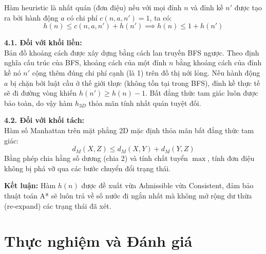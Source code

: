 \documentclass[12pt,a4paper]{article}
\begin{document}
Hàm heuristic là nhất quán (đơn điệu) nếu với mọi đỉnh $n$ và đỉnh kề $n'$ được tạo ra bởi hành động $a$ có chi phí $c(n, a, n') = 1$, ta có:
\begin{equation}
    h(n) \le c(n, a, n') + h(n') \implies h(n) \le 1 + h(n')
\end{equation}

\textbf{4.1. Đối với khối liền:}\\
Bản đồ khoảng cách được xây dựng bằng cách lan truyền BFS ngược. Theo định nghĩa cấu trúc của BFS, khoảng cách của một đỉnh $n$ bằng khoảng cách của đỉnh kề nó $n'$ cộng thêm đúng chi phí cạnh (là 1) trên đồ thị nới lỏng. Nếu hành động $a$ bị chặn bởi luật cầu ở thế giới thực (không tồn tại trong BFS), đỉnh kề thực tế sẽ đi đường vòng khiến $h(n') \ge h(n) - 1$. Bất đẳng thức tam giác luôn được bảo toàn, do vậy hàm $h_{3D}$ thỏa mãn tính nhất quán tuyệt đối.

\textbf{4.2. Đối với khối tách:}\\
Hàm số Manhattan trên mặt phẳng 2D mặc định thỏa mãn bất đẳng thức tam giác:
\begin{equation}
    d_M(X, Z) \le d_M(X, Y) + d_M(Y, Z)
\end{equation}
Bằng phép chia hằng số dương (chia 2) và tính chất tuyển $\max$, tính đơn điệu không bị phá vỡ qua các bước chuyển đổi trạng thái.

\textbf{Kết luận:} Hàm $h(n)$ được đề xuất vừa Admissible vừa Consistent, đảm bảo thuật toán A* sẽ luôn trả về số nước đi ngắn nhất mà không mở rộng dư thừa (re-expand) các trạng thái đã xét.

\section{Thực nghiệm và Đánh giá}
\end{document}
